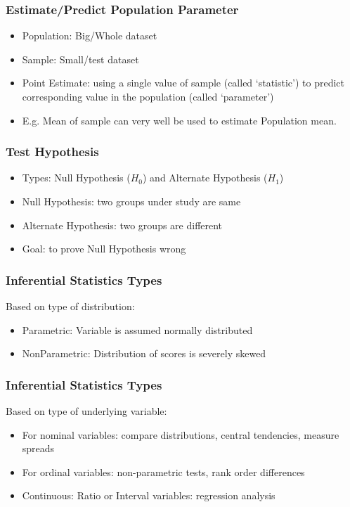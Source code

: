 \begin{frame}[fragile]\frametitle{Estimate/Predict Population Parameter}
\begin{itemize}
\item Population: Big/Whole dataset
\item Sample: Small/test dataset
\item Point Estimate: using a single value of sample (called `statistic') to predict corresponding value in the population (called `parameter')
\item E.g. Mean of sample can very well be used to estimate Population mean.
\end{itemize}
\end{frame}


\begin{frame}[fragile]\frametitle{Test Hypothesis}
\begin{itemize}
\item Types: Null Hypothesis ($H_0$) and Alternate Hypothesis ($H_1$)
\item Null Hypothesis: two groups under study are same
\item Alternate Hypothesis: two groups are different
\item Goal: to prove Null Hypothesis wrong
\end{itemize}
\end{frame}



\begin{frame}[fragile]\frametitle{Inferential Statistics Types}
Based on type of distribution:
\begin{itemize}
\item Parametric: Variable is assumed normally distributed
\item NonParametric: Distribution of scores is severely skewed
\end{itemize}
\end{frame}

\begin{frame}[fragile]\frametitle{Inferential Statistics Types}
Based on type of underlying variable:
\begin{itemize}
\item For nominal variables: compare distributions, central tendencies, measure spreads
\item For ordinal variables: non-parametric tests, rank order differences
\item Continuous: Ratio or Interval variables: regression analysis
\end{itemize}
\end{frame}



